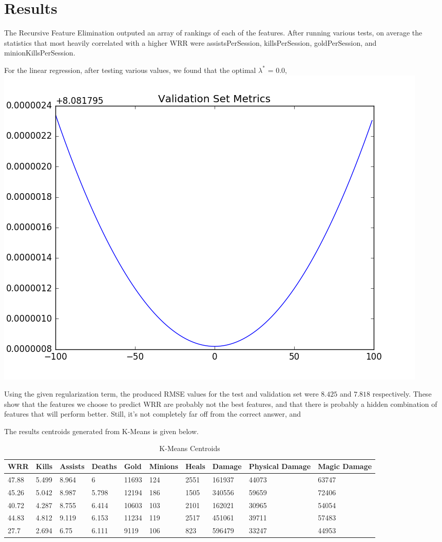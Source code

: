 \documentclass{article}
\begin{document}
	
	\section{Results}
	The Recursive Feature Elimination outputed an array of rankings of each of the features. After running various tests, on average the statistics that most heavily correlated with a higher WRR were assistsPerSession, killsPerSession, goldPerSession, and minionKillsPerSession.
	
	For the linear regression, after testing various values, we found that the optimal $\lambda^*$ = 0.0, 
	\includegraphics[scale = 0.4]{figures/RMSE_lin_reg.png}
	
	Using the given regularization term, the produced RMSE values for the test and validation set were $8.425$ and $7.818$ respectively. These show that the features we choose to predict WRR are probably not the best features, and that there is probably a hidden combination of features that will perform better. Still, it's not completely far off from the correct answer, and 
	
	The results centroids generated from K-Means is given below.
	\begin{table}[]
		\centering
		\caption{K-Means Centroids}
		\label{K-Means}
		\begin{tabular}{|l|l|l|l|l|l|l|l|l|l|}
			\hline
			WRR   & Kills & Assists & Deaths & Gold  & Minions & Heals & Damage & Physical Damage & Magic Damage \\ \hline
			47.88 & 5.499 & 8.964   & 6      & 11693 & 124     & 2551  & 161937 & 44073           & 63747        \\ \hline
			45.26 & 5.042 & 8.987   & 5.798  & 12194 & 186     & 1505  & 340556 & 59659           & 72406        \\ \hline
			40.72 & 4.287 & 8.755   & 6.414  & 10603 & 103     & 2101  & 162021 & 30965           & 54054        \\ \hline
			44.83 & 4.812 & 9.119   & 6.153  & 11234 & 119     & 2517  & 451061 & 39711           & 57483        \\ \hline
			27.7  & 2.694 & 6.75    & 6.111  & 9119  & 106     & 823   & 596479 & 33247           & 44953        \\ \hline
		\end{tabular}
	\end{table}
	
\end{document}
